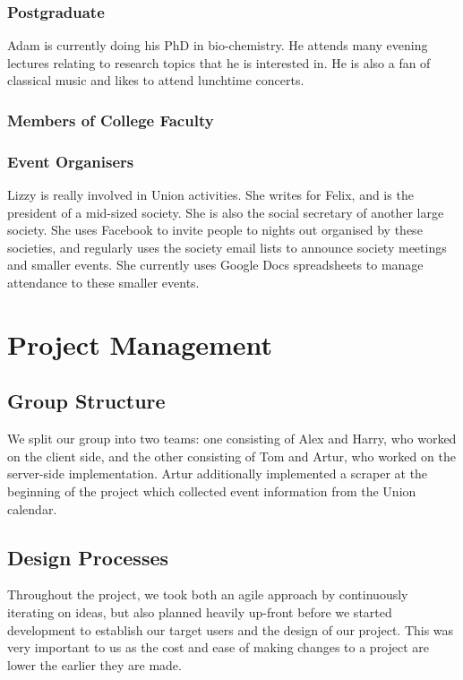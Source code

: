 \documentclass[11pt]{article}
\begin{document}
\subsubsection{Postgraduate}
Adam is currently doing his PhD in bio-chemistry. He attends many evening lectures relating to research topics that he is interested in. He is also a fan of classical music and likes to attend lunchtime concerts.

\subsubsection{Members of College Faculty}
\subsubsection{Event Organisers}
Lizzy is really involved in Union activities. She writes for Felix, and is the president of a mid-sized society. She is also the social secretary of another large society. She uses Facebook to invite people to nights out organised by these societies, and regularly uses the society email lists to announce society meetings and smaller events. She currently uses Google Docs spreadsheets to manage attendance to these smaller events.
\section {Project Management}

\subsection {Group Structure}

We split our group into two teams: one consisting of Alex and Harry, who worked on the client side, and the other consisting of Tom and Artur, who worked on the server-side implementation. Artur additionally implemented a scraper at the beginning of the project which collected event information from the Union calendar.

\subsection {Design Processes}

Throughout the project, we took both an agile approach by continuously iterating on ideas, but also planned heavily up-front before we started development to establish our target users and the design of our project. This was very important to us as the cost and ease of making changes to a project are lower the earlier they are made.
\end{document}
